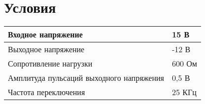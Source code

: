 \chapter{Условия}

    \begin{table}[ht]
	\begin{tabular}{|l|l|}
		\hline
Входное напряжение &								    15 В
 \\ \hline
Выходное напряжение &								    -12 В \\ \hline
Сопротивление нагрузки &							600 Ом
\\ \hline
Амплитуда пульсаций выходного напряжения &				    0,5 В
\\ \hline
Частота переключения& 								 25 КГц
\\ \hline
		
	\end{tabular}
\end{table}
